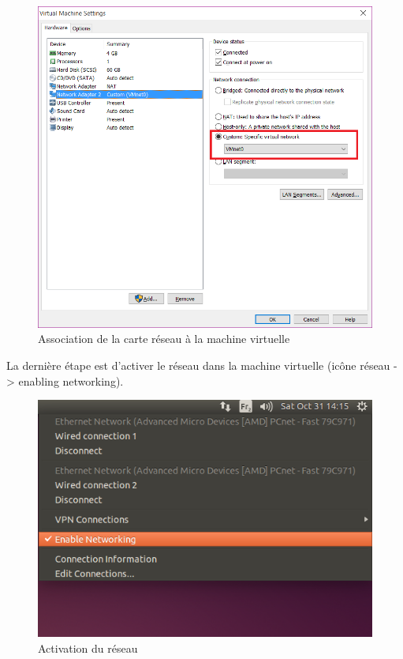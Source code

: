 \begin{figure}[H]
	\begin{center}
		\includegraphics[width=14cm]{img/vmConfig2.png}
		\caption{Association de la carte réseau à la machine virtuelle}
		\label{evLinuxConfig2}
	\end{center}
\end{figure}
La dernière étape est d’activer le réseau dans la machine virtuelle (icône réseau -> enabling networking).
\begin{figure}[H]
	\begin{center}
		\includegraphics[width=14cm]{img/vmConfig3.png}
		\caption{Activation du réseau}
		\label{evLinuxConfig3}
	\end{center}
\end{figure}

